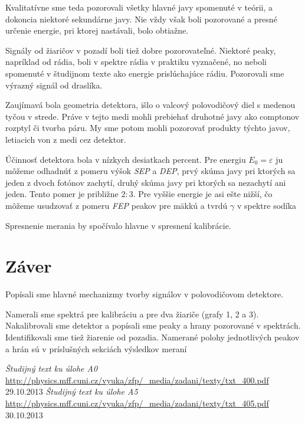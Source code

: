 \documentclass[a4paper, 10pt]{article}
\begin{document}
Kvalitatívne sme teda pozorovali všetky hlavné javy spomenuté v teórii, a dokoncia niektoré sekundárne javy. Nie vždy však boli pozorované a presné určenie energie, pri ktorej nastávali, bolo obtiažne. 

Signály od žiaričov v pozadí boli tiež dobre pozorovateľné. Niektoré peaky, napríklad od rádia, boli v spektre rádia v praktiku vyznačené, no neboli spomenuté v študijnom texte ako energie prislúchajúce rádiu. Pozorovali sme výrazný signál od draslíka.

Zaujímavá bola geometria detektora, išlo o valcový polovodičový diel s medenou tyčou v strede. Práve v tejto medi mohli prebiehať druhotné javy ako comptonov rozptyl či tvorba páru. My sme potom mohli pozorovať produkty týchto javov, letiacich von z medi cez detektor.

Účinnosť detektora bola v nízkych desiatkach percent. Pre energiu $E_0=\varepsilon$ ju môžeme odhadnúť z pomeru výšok \textit{SEP} a \textit{DEP}, prvý skúma javy pri ktorých sa jeden z dvoch fotónov zachytí, druhý skúma javy pri ktorých sa nezachytí ani jeden. Tento pomer je približne $2:3$. Pre vyššie energie je asi ešte nižší, čo môžeme usudzovať z pomeru \textit{FEP} peakov pre mäkkú a tvrdú $\gamma$ v spektre sodíka

Spresnenie merania by spočívalo hlavne v spresnení kalibrácie.
\section*{Záver}
Popísali sme hlavné mechanizmy tvorby signálov v polovodičovom detektore. 

Namerali sme spektrá pre kalibráciu a pre dva žiariče (grafy 1, 2 a 3). Nakalibrovali sme detektor a popísali sme peaky a hrany pozorované v spektrách. Identifikovali sme tiež žiarenie od pozadia. Namerané polohy jednotlivých peakov a hrán sú v príslušných sekciách výsledkov meraní

\begin{thebibliography}{9}
    \emph{Študijný text ku úlohe A0} \\
    \url{http://physics.mff.cuni.cz/vyuka/zfp/_media/zadani/texty/txt_400.pdf} 29.10.2013
    \emph{Študijný text ku úlohe A5} \\
    \url{http://physics.mff.cuni.cz/vyuka/zfp/_media/zadani/texty/txt_405.pdf} 30.10.2013
\end{thebibliography}
\end{document}
